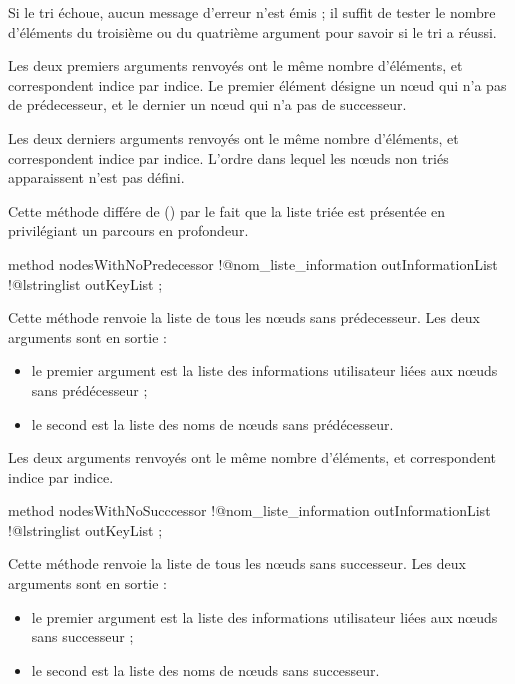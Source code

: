 Si le tri échoue, aucun message d'erreur n'est émis ; il suffit de tester le nombre d'éléments du troisième ou du quatrième argument pour savoir si le tri a réussi.

Les deux premiers arguments renvoyés ont le même nombre d'éléments, et correspondent indice par indice. Le premier élément désigne un nœud qui n'a pas de prédecesseur, et le dernier un nœud qui n'a pas de successeur.


Les deux derniers arguments renvoyés ont le même nombre d'éléments, et correspondent indice par indice. L'ordre dans lequel les nœuds non triés apparaissent n'est pas défini.

Cette méthode différe de  () par le fait que la liste triée est présentée en privilégiant un parcours en profondeur.







\begin{galgascode}
method nodesWithNoPredecessor
  !@nom_liste_information outInformationList
  !@lstringlist outKeyList
;
\end{galgascode}

Cette méthode renvoie la liste de tous les nœuds sans prédecesseur. Les deux arguments sont en sortie :
\begin{itemize}
  \item le premier argument  est la liste des informations utilisateur liées aux nœuds sans prédécesseur ;
  \item le second  est la liste des noms de nœuds sans prédécesseur.
\end{itemize}

Les deux arguments renvoyés ont le même nombre d'éléments, et correspondent indice par indice.







\begin{galgascode}
method nodesWithNoSucccessor
  !@nom_liste_information outInformationList
  !@lstringlist outKeyList
;
\end{galgascode}

Cette méthode renvoie la liste de tous les nœuds sans successeur. Les deux arguments sont en sortie :
\begin{itemize}
  \item le premier argument  est la liste des informations utilisateur liées aux nœuds sans successeur ;
  \item le second  est la liste des noms de nœuds sans successeur.
\end{itemize}

